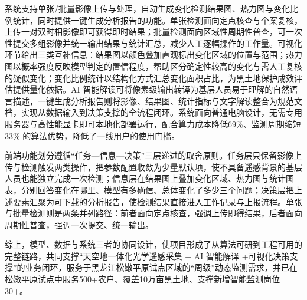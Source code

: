 系统支持单张/批量影像上传与处理，自动生成变化检测结果图、热力图与变化比例统计，同时提供一键生成分析报告的功能。单张检测面向定点核查与个案复核，上传一对双时相影像即可获得即时结果；批量检测面向区域性周期性普查，可一次性提交多组影像并统一输出结果与统计汇总，减少人工逐幅操作的工作量。可视化环节给出三类互补信息：结果图以颜色叠加直观标出变化区域的位置与范围；热力图以概率强度反映模型判定的置信程度，帮助区分确定性较高的变化与需人工复核的疑似变化；变化比例统计以结构化方式汇总变化面积占比，为黑土地保护成效评估提供量化依据。AI 智能解读可将像素级输出转译为基层人员易于理解的自然语言描述，一键生成分析报告则将影像、结果图、统计指标与文字解读整合为规范文档，实现从数据输入到决策支撑的全流程闭环。系统面向普通电脑设计，无需专用服务器与高性能显卡即可本地化部署运行，配合算力成本降低69\%、监测周期缩短33\% 的算法优势，降低了一线用户的使用门槛。

前端功能划分遵循“任务—信息—决策”三层递进的取舍原则。任务层只保留影像上传与检测触发两类操作，把参数配置收敛为少量默认项，使不具备遥感背景的基层人员也能独立完成一次检测；信息层在结果图上叠加变化区域、热力图与统计图表，分别回答变化在哪里、模型有多确信、总体变化了多少三个问题；决策层把上述要素汇聚为可下载的分析报告，使检测结果直接进入工作记录与上报流程。单张与批量检测则是两条并列路径：前者面向定点核查，强调上传即得结果，后者面向周期性普查，强调一次提交、统一输出。

综上，模型、数据与系统三者的协同设计，使项目形成了从算法可研到工程可用的完整链路，共同支撑“天空地一体化光学遥感采集 + AI 智能解译 +可视化决策支撑”的业务闭环，服务于黑龙江松嫩平原试点区域的“周级”动态监测需求，并已在松嫩平原试点中服务500+农户、覆盖10万亩黑土地、支撑新增智能监测岗位30+。
